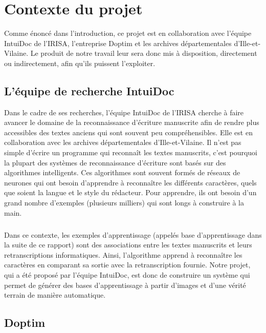 \hypertarget{c3}{\chapter{Contexte du projet}}

Comme énoncé dans l’introduction, ce projet est en collaboration avec l’équipe IntuiDoc de l’IRISA,
l’entreprise Doptim et les archives départementales d'Ille-et-Vilaine. Le produit de notre travail
leur sera donc mis à disposition, directement ou indirectement, afin qu’ils puissent l’exploiter.

\section{L’équipe de recherche IntuiDoc}

Dans le cadre de ses recherches, l’équipe IntuiDoc de l’IRISA cherche à faire avancer le domaine
de la reconnaissance d’écriture manuscrite afin de rendre plus accessibles des textes anciens qui
sont souvent peu compréhensibles. Elle est en collaboration avec les archives départementales
d'Ille-et-Vilaine. Il n’est pas simple d’écrire un programme qui reconnaît les textes manuscrits,
c’est pourquoi la plupart des systèmes de reconnaissance d’écriture sont basés sur des algorithmes
intelligents. Ces algorithmes sont souvent formés de réseaux de neurones qui ont besoin d’apprendre
à reconnaître les différents caractères, quels que soient la langue et le style du rédacteur.
Pour apprendre, ils ont besoin d’un grand nombre d’exemples (plusieurs milliers) qui sont longs
à construire à la main. 

\paragraph{}
Dans ce contexte, les exemples d’apprentissage (appelés base d’apprentissage dans la suite de ce rapport)
sont des associations entre les textes manuscrits et leurs retranscriptions informatiques. Ainsi,
l’algorithme apprend à reconnaître les caractères en comparant sa sortie avec la retranscription fournie.
Notre projet, qui a été proposé par l’équipe IntuiDoc, est donc de construire un système qui
permet de générer des bases d’apprentissage à partir d'images et d'une vérité terrain de manière automatique.

\section{Doptim}

